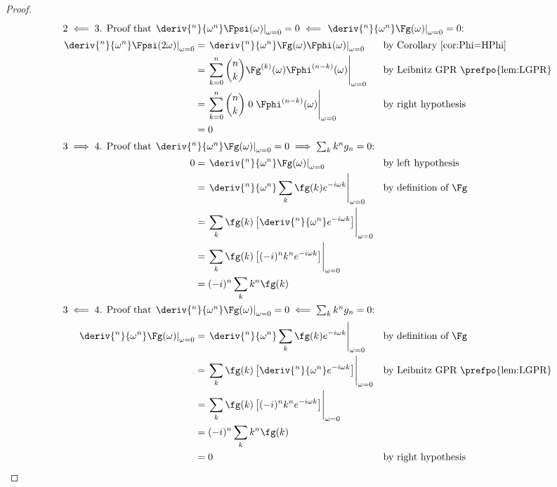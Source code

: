 \begin{proof}
\begin{align*}
  \intertext{$2\impliedby3$. Proof that $\left.\deriv{^n}{\omega^n} \Fpsi(\omega)\right|_{\omega=0}=0 \impliedby \left.\deriv{^n}{\omega^n} \Fg(\omega)\right|_{\omega=0}=0$:}
    \left.\deriv{^n}{\omega^n} \Fpsi(2\omega)\right|_{\omega=0}
      &= \left.\deriv{^n}{\omega^n} \Fg(\omega)\Fphi(\omega)\right|_{\omega=0}
      && \text{by Corollary~\ref{cor:Phi=HPhi}}
    \\&= \left.\sum_{k=0}^n {n \choose k} \Fg^{(k)}(\omega)\Fphi^{(n-k)}(\omega)\right|_{\omega=0}
      && \text{by Leibnitz GPR \prefpo{lem:LGPR}}
    \\&= \left.\sum_{k=0}^n {n \choose k} \;0\; \Fphi^{(n-k)}(\omega)\right|_{\omega=0}
      && \text{by right hypothesis}
    \\&= 0
\\
  \intertext{$3\implies4$. Proof that $\left.\deriv{^n}{\omega^n} \Fg(\omega)\right|_{\omega=0}=0 \implies \sum_k k^n  g_n  = 0$:}
    0
      &= \left.\deriv{^n}{\omega^n} \Fg(\omega)\right|_{\omega=0}
      && \text{by left hypothesis}
    \\&= \left.\deriv{^n}{\omega^n} \sum_k \fg(k)e^{-i\omega k} \right|_{\omega=0}
      && \text{by definition of $\Fg$}
    \\&= \left. \sum_k \fg(k)\left[\deriv{^n}{\omega^n} e^{-i\omega k}\right] \right|_{\omega=0}
    \\&= \left. \sum_k \fg(k)\left[(-i)^n k^n e^{-i\omega k}\right] \right|_{\omega=0}
    \\&= (-i)^n \sum_k k^n \fg(k)
\\
  \intertext{$3\impliedby4$. Proof that $\left.\deriv{^n}{\omega^n} \Fg(\omega)\right|_{\omega=0}=0 \impliedby \sum_k k^n  g_n  = 0$:}
    \left.\deriv{^n}{\omega^n} \Fg(\omega)\right|_{\omega=0}
      &= \left.\deriv{^n}{\omega^n} \sum_k \fg(k)e^{-i\omega k} \right|_{\omega=0}
      && \text{by definition of $\Fg$}
    \\&= \left. \sum_k \fg(k)\left[\deriv{^n}{\omega^n} e^{-i\omega k}\right] \right|_{\omega=0}
      && \text{by Leibnitz GPR \prefpo{lem:LGPR}}
    \\&= \left. \sum_k \fg(k)\left[(-i)^n k^n e^{-i\omega k}\right] \right|_{\omega=0}
    \\&= (-i)^n \sum_k k^n \fg(k)
    \\&= 0
      && \text{by right hypothesis}
\end{align*}
\end{proof}









